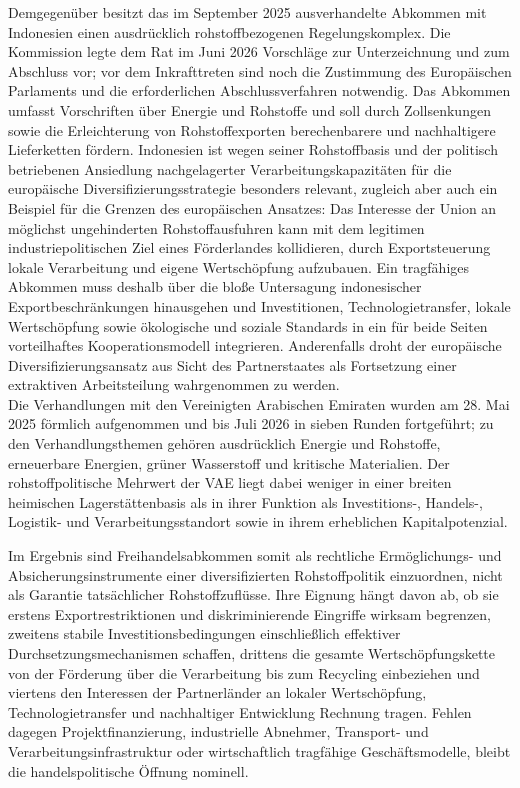 \documentclass[12pt,a4paper,oneside]{book} %
\begin{document}
Demgegenüber besitzt das im September 2025 ausverhandelte Abkommen mit Indonesien einen ausdrücklich rohstoffbezogenen Regelungskomplex. Die Kommission legte dem Rat im Juni 2026 Vorschläge zur Unterzeichnung und zum Abschluss vor; vor dem Inkrafttreten sind noch die Zustimmung des Europäischen Parlaments und die erforderlichen Abschlussverfahren notwendig. Das Abkommen umfasst Vorschriften über Energie und Rohstoffe und soll durch Zollsenkungen sowie die Erleichterung von Rohstoffexporten berechenbarere und nachhaltigere Lieferketten fördern. Indonesien ist wegen seiner Rohstoffbasis und der politisch betriebenen Ansiedlung nachgelagerter Verarbeitungskapazitäten für die europäische Diversifizierungsstrategie besonders relevant, zugleich aber auch ein Beispiel für die Grenzen des europäischen Ansatzes: Das Interesse der Union an möglichst ungehinderten Rohstoffausfuhren kann mit dem legitimen industriepolitischen Ziel eines Förderlandes kollidieren, durch Exportsteuerung lokale Verarbeitung und eigene Wertschöpfung aufzubauen. Ein tragfähiges Abkommen muss deshalb über die bloße Untersagung indonesischer Exportbeschränkungen hinausgehen und Investitionen, Technologietransfer, lokale Wertschöpfung sowie ökologische und soziale Standards in ein für beide Seiten vorteilhaftes Kooperationsmodell integrieren. Anderenfalls droht der europäische Diversifizierungsansatz aus Sicht des Partnerstaates als Fortsetzung einer extraktiven Arbeitsteilung wahrgenommen zu werden.
\\
Die Verhandlungen mit den Vereinigten Arabischen Emiraten wurden am 28. Mai 2025 förmlich aufgenommen und bis Juli 2026 in sieben Runden fortgeführt; zu den Verhandlungsthemen gehören ausdrücklich Energie und Rohstoffe, erneuerbare Energien, grüner Wasserstoff und kritische Materialien. Der rohstoffpolitische Mehrwert der VAE liegt dabei weniger in einer breiten heimischen Lagerstättenbasis als in ihrer Funktion als Investitions-, Handels-, Logistik- und Verarbeitungsstandort sowie in ihrem erheblichen Kapitalpotenzial.

Im Ergebnis sind Freihandelsabkommen somit als rechtliche Ermöglichungs- und Absicherungsinstrumente einer diversifizierten Rohstoffpolitik einzuordnen, nicht als Garantie tatsächlicher Rohstoffzuflüsse. Ihre Eignung hängt davon ab, ob sie erstens Exportrestriktionen und diskriminierende Eingriffe wirksam begrenzen, zweitens stabile Investitionsbedingungen einschließlich effektiver Durchsetzungsmechanismen schaffen, drittens die gesamte Wertschöpfungskette von der Förderung über die Verarbeitung bis zum Recycling einbeziehen und viertens den Interessen der Partnerländer an lokaler Wertschöpfung, Technologietransfer und nachhaltiger Entwicklung Rechnung tragen. Fehlen dagegen Projektfinanzierung, industrielle Abnehmer, Transport- und Verarbeitungsinfrastruktur oder wirtschaftlich tragfähige Geschäftsmodelle, bleibt die handelspolitische Öffnung nominell.
\end{document}
